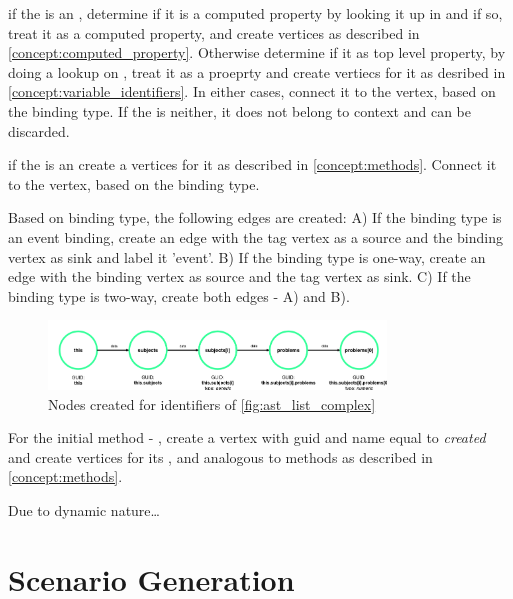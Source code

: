 if the  is an , determine if it is a computed property by looking it up in  and if so, treat it as a computed property, and create vertices as described in \ref{concept:computed_property}. Otherwise determine if it as top level property, by doing a lookup on , treat it as a proeprty and create vertiecs for it as desribed in \ref{concept:variable_identifiers}. In either cases, connect it to the  vertex, based on the binding type. If the  is neither, it does not belong to context and can be discarded. %

if the  is an  create a vertices for it as described in \ref{concept:methods}. Connect it to the  vertex, based on the binding type.

Based on binding type, the following edges are created:
A) If the binding type is an event binding, create an 
edge with the tag vertex as a source and the binding vertex as sink and label it 'event'. 
B) If the binding type is one-way, create an edge with the binding vertex as source and the tag vertex as sink.
C) If the binding type is two-way, create both edges - A) and B).


\begin{figure}[H]
    \includegraphics[width=0.8\textwidth]{images/graph_numeric_generic.png}
     \caption{Nodes created for identifiers of \ref{fig:ast_list_complex} }
     \label{fig:ast_list_complex_nodes}
\end{figure}

For the initial method - , create a vertex with \gls{guid} and name equal to \textit{created} and create vertices for its  ,  and  analogous to methods as described in \ref{concept:methods}. 




Due to dynamic nature\dots
\section{Scenario Generation}

